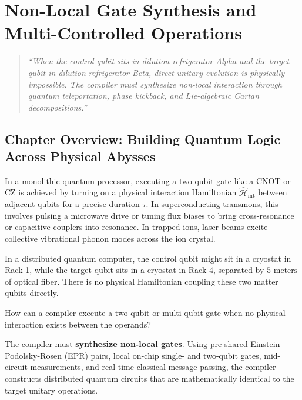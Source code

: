 \chapter{Non-Local Gate Synthesis and Multi-Controlled Operations}
\label{ch:nonlocal_gate_synthesis}

\begin{quote}
\textit{``When the control qubit sits in dilution refrigerator Alpha and the target qubit in dilution refrigerator Beta, direct unitary evolution is physically impossible. The compiler must synthesize non-local interaction through quantum teleportation, phase kickback, and Lie-algebraic Cartan decompositions.''}
\end{quote}

\section*{Chapter Overview: Building Quantum Logic Across Physical Abysses}

In a monolithic quantum processor, executing a two-qubit gate like a CNOT or CZ is achieved by turning on a physical interaction Hamiltonian $\hat{\mathcal{H}}_{\text{int}}$ between adjacent qubits for a precise duration $\tau$. In superconducting transmons, this involves pulsing a microwave drive or tuning flux biases to bring cross-resonance or capacitive couplers into resonance. In trapped ions, laser beams excite collective vibrational phonon modes across the ion crystal.

In a distributed quantum computer, the control qubit might sit in a cryostat in Rack 1, while the target qubit sits in a cryostat in Rack 4, separated by $5\text{ meters}$ of optical fiber. There is no physical Hamiltonian coupling these two matter qubits directly. 

How can a compiler execute a two-qubit or multi-qubit gate when no physical interaction exists between the operands?

The compiler must \textbf{synthesize non-local gates}. Using pre-shared Einstein-Podolsky-Rosen (EPR) pairs, local on-chip single- and two-qubit gates, mid-circuit measurements, and real-time classical message passing, the compiler constructs distributed quantum circuits that are mathematically identical to the target unitary operations.


